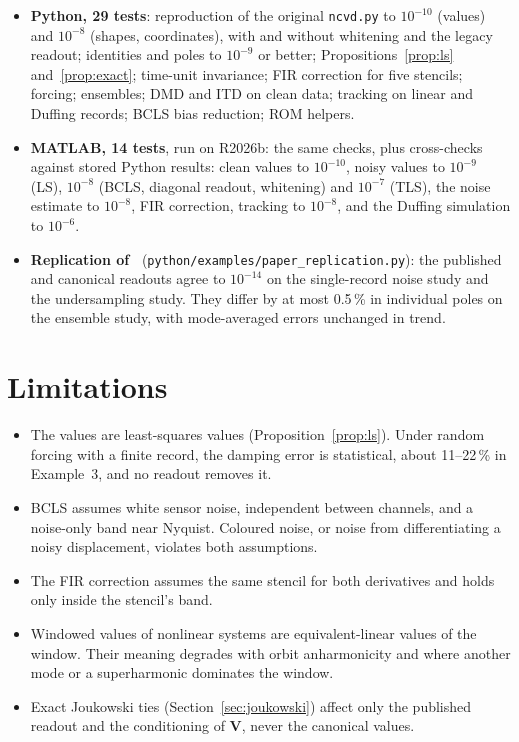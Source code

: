 \documentclass[report]{nld}
\theoremstyle{remark}\newtheorem*{remark}{Remark}
\newcommand{\V}{\mathbf{V}}
\newcommand{\code}[1]{\texttt{#1}}
\begin{document}
\begin{itemize}
  \item \textbf{Python, 29 tests}: reproduction of the original \code{ncvd.py}
    to $10^{-10}$ (values) and $10^{-8}$ (shapes, coordinates), with and
    without whitening and the legacy readout; identities and poles to
    $10^{-9}$ or better; Propositions~\ref{prop:ls} and~\ref{prop:exact};
    time-unit invariance; FIR correction for five stencils; forcing; ensembles;
    DMD and ITD on clean data; tracking on linear and Duffing records; BCLS
    bias reduction; ROM helpers.
  \item \textbf{MATLAB, 14 tests}, run on R2026b: the same checks, plus
    cross-checks against stored Python results: clean values to $10^{-10}$,
    noisy values to $10^{-9}$ (LS), $10^{-8}$ (BCLS, diagonal readout, whitening)
    and $10^{-7}$ (TLS), the noise estimate to $10^{-8}$, FIR correction, tracking to
    $10^{-8}$, and the Duffing simulation to $10^{-6}$.
  \item \textbf{Replication of~\cite{li2025}}
    (\code{python/examples/paper\_replication.py}): the published and canonical
    readouts agree to $10^{-14}$ on the single-record noise study and the
    undersampling study. They differ by at most 0.5\,\% in individual poles on
    the ensemble study, with mode-averaged errors unchanged in trend.
\end{itemize}

\section{Limitations}

\begin{itemize}
  \item The values are least-squares values (Proposition~\ref{prop:ls}). Under
    random forcing with a finite record, the damping error is statistical, about
    11--22\,\% in Example~3, and no readout removes it.
  \item BCLS assumes white sensor noise, independent between channels, and a
    noise-only band near Nyquist. Coloured noise, or noise from differentiating
    a noisy displacement, violates both assumptions.
  \item The FIR correction assumes the same stencil for both derivatives and
    holds only inside the stencil's band.
  \item Windowed values of nonlinear systems are equivalent-linear values of
    the window. Their meaning degrades with orbit anharmonicity and where
    another mode or a superharmonic dominates the window.
  \item Exact Joukowski ties (Section~\ref{sec:joukowski}) affect only the
    published readout and the conditioning of $\V$, never the canonical values.
\end{itemize}
\end{document}
